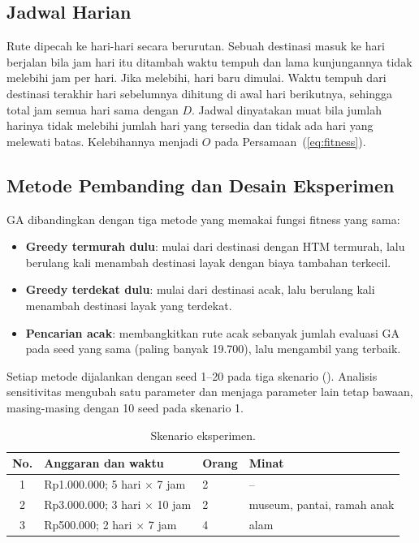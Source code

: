 \subsection{Jadwal Harian}
\label{sec:jadwal}

Rute dipecah ke hari-hari secara berurutan. Sebuah destinasi masuk ke hari berjalan bila jam hari itu ditambah waktu tempuh dan lama kunjungannya tidak melebihi jam per hari. Jika melebihi, hari baru dimulai. Waktu tempuh dari destinasi terakhir hari sebelumnya dihitung di awal hari berikutnya, sehingga total jam semua hari sama dengan $D$. Jadwal dinyatakan muat bila jumlah harinya tidak melebihi jumlah hari yang tersedia dan tidak ada hari yang melewati batas. Kelebihannya menjadi $O$ pada Persamaan~(\ref{eq:fitness}).

\subsection{Metode Pembanding dan Desain Eksperimen}
\label{sec:eksperimen}

GA dibandingkan dengan tiga metode yang memakai fungsi fitness yang sama:
\begin{itemize}
  \item \textbf{Greedy termurah dulu}: mulai dari destinasi dengan HTM termurah, lalu berulang kali menambah destinasi layak dengan biaya tambahan terkecil.
  \item \textbf{Greedy terdekat dulu}: mulai dari destinasi acak, lalu berulang kali menambah destinasi layak yang terdekat.
  \item \textbf{Pencarian acak}: membangkitkan rute acak sebanyak jumlah evaluasi GA pada seed yang sama (paling banyak 19.700), lalu mengambil yang terbaik.
\end{itemize}
Setiap metode dijalankan dengan seed 1--20 pada tiga skenario (). Analisis sensitivitas mengubah satu parameter dan menjaga parameter lain tetap bawaan, masing-masing dengan 10 seed pada skenario 1.

\begin{table}[H]
\centering
\caption{Skenario eksperimen.}
\label{tab:skenario}
\small
\begin{tabular}{@{}c l l l@{}}
\toprule
\textbf{No.} & \textbf{Anggaran dan waktu} & \textbf{Orang} & \textbf{Minat} \\
\midrule
1 & Rp1.000.000; 5 hari $\times$ 7 jam & 2 & -- \\
2 & Rp3.000.000; 3 hari $\times$ 10 jam & 2 & museum, pantai, ramah anak \\
3 & Rp500.000; 2 hari $\times$ 7 jam & 4 & alam \\
\bottomrule
\end{tabular}
\end{table}

